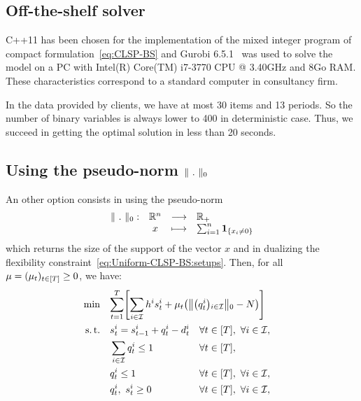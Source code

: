 \subsection{Off-the-shelf solver}


C++11 has been chosen for the implementation of the mixed integer program of compact formulation~\eqref{eq:CLSP-BS} and Gurobi 6.5.1~\cite{gurobi} was used to solve the model on a PC with Intel(R) Core(TM) i7-3770 CPU @ 3.40GHz and 8Go RAM. These characteristics correspond to a standard computer in consultancy firm.

In the data provided by clients, we have at most 30 items and 13 periods. So the number of binary variables is always lower to 400 in deterministic case. Thus, we succeed in getting the optimal solution in less than 20 seconds.


\subsection{Using the pseudo-norm $\norm{\ .\ }_0$}


An other option consists in using the pseudo-norm
\begin{equation}
\begin{array}{lccl}
  \norm{\ .\ }_0 :& \RR^n & \longrightarrow & \RR_+
  \\
  & x & \longmapsto & \sum_{i=1}^n \findi{\crbracket{x_i \ne 0}}
\end{array}
\end{equation}
which returns the size of the support of the vector $x$ and in dualizing the flexibility constraint~\eqref{eq:Uniform-CLSP-BS:setups}. Then, for all $\mu=\bracket{\mu_t}_{t\in\range{\horizon}}\ge 0$, we have:
\begin{equation}\label{eq:Lagrangian:setups}
  \begin{aligned}
    \min\quad & \rlap{$\ds \sum_{t=1}^{\horizon} \sqbracket{ \sum_{i\in\REF} \holding^i \inventory_t^i + \mu_t \bracket{ \norm{\bracket{\quantity_t^i}_{i\in\REF}}_0 - \nbsetups} }$}
    \\
    \st\quad & \ds \inventory_t^i = \inventory_{t-1}^i + \quantity_t^i - \demand_t^i && \forall t\in\range{\horizon},\ \forall i\in\REF,
    \\
    & \ds \sum_{i\in\REF} \quantity_t^i \le 1 && \forall t\in\range{\horizon},
    \\
    & \ds \quantity_t^i \le 1 && \forall t\in\range{\horizon},\ \forall i\in\REF,
    \\
    & \ds \quantity_t^i,\ \inventory_t^i \ge 0 && \forall t\in\range{\horizon},\ \forall i\in\REF,
  \end{aligned}
\end{equation}

